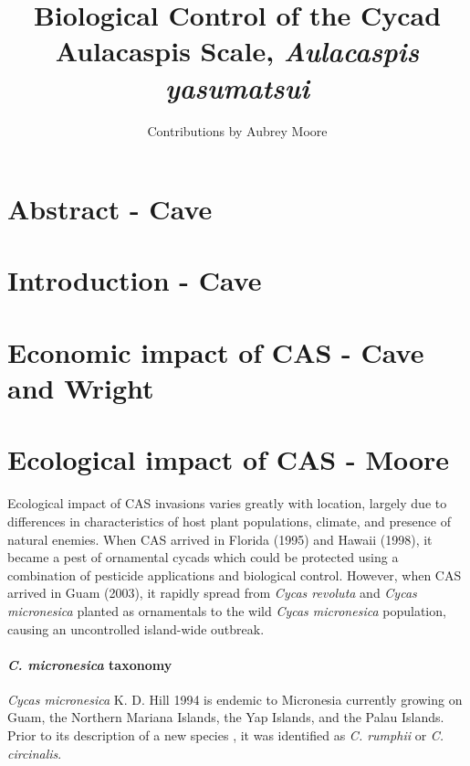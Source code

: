 \documentclass[12pt,letterpaper,english,bibliography=totocnumbered, abstract=on]{scrartcl}
\begin{document}
\title{Biological Control of the Cycad Aulacaspis Scale, \textit{Aulacaspis yasumatsui}}

\author{Contributions by Aubrey Moore}

\maketitle
\newpage
\tableofcontents

\pagebreak

\section{Abstract - Cave}

\section{Introduction - Cave}

\section{Economic impact of CAS - Cave and Wright}

\section{Ecological impact of CAS - Moore}

Ecological impact of CAS invasions varies greatly with location, largely due to differences in characteristics of host plant populations, climate, and presence of natural enemies. When CAS arrived in Florida (1995) and Hawaii (1998), it became a pest of ornamental cycads which could be protected using a combination of pesticide applications and biological control. However, when CAS arrived in Guam (2003), it rapidly spread from \textit{Cycas revoluta} and \textit{Cycas micronesica} planted as ornamentals to the wild \textit{Cycas micronesica} population, causing an uncontrolled island-wide outbreak. 

\paragraph{\textit{C. micronesica} taxonomy} \textit{Cycas micronesica} K. D. Hill 1994 is endemic to Micronesia currently growing on Guam, the Northern Mariana Islands, the Yap Islands, and the Palau Islands. Prior to its description of a new species \parencite{hillCycasRumphiiComplex1994}, it was identified as \textit{C. rumphii} or \textit{C. circinalis}.
\end{document}
